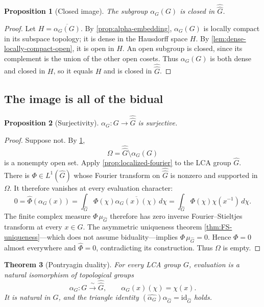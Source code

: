 \documentclass[11pt]{article}
\newtheorem{theorem}{Theorem}[section]
\newtheorem{proposition}[theorem]{Proposition}
\theoremstyle{definition}
\theoremstyle{remark}
\newcommand{\id}{\mathrm{id}}
\newcommand{\Lp}[1]{L^{#1}}
\newcommand{\dual}[1]{\widehat{#1}}
\newcommand{\bidual}[1]{\widehat{\widehat{#1}}}
\begin{document}
\begin{proposition}[Closed image]
\label{prop:alpha-closed}
The subgroup $\alpha_G(G)$ is closed in $\bidual G$.
\end{proposition}

\begin{proof}
Let $H=\overline{\alpha_G(G)}$.  By
\cref{prop:alpha-embedding}, $\alpha_G(G)$ is locally compact in its subspace topology;
it is dense in the Hausdorff space $H$.  By
\cref{lem:dense-locally-compact-open}, it is open in $H$.  An open subgroup is closed,
since its complement is the union of the other open cosets.  Thus $\alpha_G(G)$ is both
dense and closed in $H$, so it equals $H$ and is closed in $\bidual G$.
\end{proof}

\subsection{The image is all of the bidual}

\begin{proposition}[Surjectivity]
\label{prop:alpha-surjective}
$\alpha_G:G\to\bidual G$ is surjective.
\end{proposition}

\begin{proof}
Suppose not.  By \cref{prop:alpha-closed},
\[
  \Omega=\bidual G\setminus\alpha_G(G)
\]
is a nonempty open set.  Apply \cref{prop:localized-fourier} to the LCA group
$\dual G$.  There is $\Phi\in\Lp1(\dual G)$ whose Fourier transform on $\bidual G$ is
nonzero and supported in $\Omega$.  It therefore vanishes at every evaluation character:
\begin{equation}
  0=\widehat\Phi(\alpha_G(x))
  =\int_{\dual G}\Phi(\chi)\overline{\alpha_G(x)(\chi)}\,d\chi
  =\int_{\dual G}\Phi(\chi)\chi(x^{-1})\,d\chi.
  \label{eq:surjectivity-zero-transform}
\end{equation}
The finite complex measure $\Phi\,\mu_{\dual G}$ therefore has zero inverse
Fourier--Stieltjes transform at every $x\in G$.  The asymmetric uniqueness theorem
\cref{thm:FS-uniqueness}---which does not assume biduality---implies
$\Phi\,\mu_{\dual G}=0$.  Hence $\Phi=0$ almost everywhere and
$\widehat\Phi=0$, contradicting its construction.  Thus $\Omega$ is empty.
\end{proof}

\begin{theorem}[Pontryagin duality]
\label{thm:pontryagin}
For every LCA group $G$, evaluation is a natural isomorphism of topological groups
\begin{equation}
  \alpha_G:G\xrightarrow{\ \sim\ }\bidual G,
  \qquad \alpha_G(x)(\chi)=\chi(x).
  \label{eq:pontryagin-isomorphism}
\end{equation}
It is natural in $G$, and the triangle identity
$(\dual{\alpha_G})\alpha_{\dual G}=\id_{\dual G}$ holds.
\end{theorem}
\end{document}
